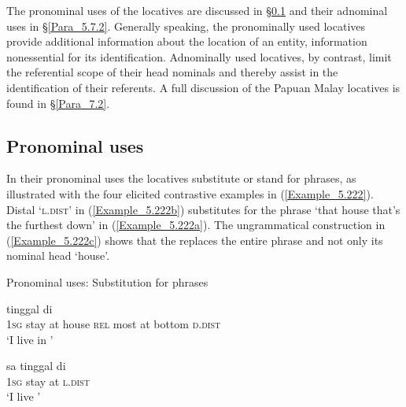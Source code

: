 The pronominal uses of the locatives are discussed in §\ref{Para_5.7.1} and their adnominal uses in §\ref{Para_5.7.2}. Generally speaking, the pronominally used locatives provide additional information about the location of an entity, information nonessential for its identification. Adnominally used locatives, by contrast, limit the referential scope of their head nominals and thereby assist in the identification of their referents. A full discussion of the Papuan Malay locatives is found in §\ref{Para_7.2}.


\subsection{Pronominal uses}
\label{Para_5.7.1}
In their pronominal uses the locatives substitute or stand for  phrases, as illustrated with the four elicited contrastive examples in (\ref{Example_5.222}). Distal  ‘\textsc{l.dist}’ in (\ref{Example_5.222b}) substitutes for the  phrase  ‘that house that’s the furthest down’ in (\ref{Example_5.222a}). The ungrammatical construction in (\ref{Example_5.222c}) shows that the  replaces the entire  phrase and not only its nominal head  ‘house’.


\begin{styleExampleTitle}
Pronominal uses: Substitution for  phrases
\end{styleExampleTitle}

\ea
\label{Example_5.222}
\ea
\label{Example_5.222a}
 {tinggal} {di} {} {} {} {} {} {}\\ %
   \textsc{1sg}  stay  at  house  \textsc{rel}  most  at  bottom  \textsc{d.dist}\\
\glt ‘I live in ’ \textstyleExampleSource{[Elicited FS120314-001.007]}\\
\vspace{5pt}

\ex
\label{Example_5.222b}
 \gll  sa  tinggal  di  \\
   \textsc{1sg}  stay  at  \textsc{l.dist}\\
\glt ‘I live ’ \textstyleExampleSource{[Elicited FS120314-001.008]}\\
\vspace{5pt}

